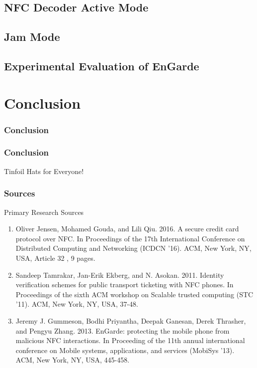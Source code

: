 \documentclass[unknownkeysallowed]{beamer}
\begin{document}
\subsection{NFC Decoder Active Mode}
\subsection{Jam Mode}
\subsection{Experimental Evaluation of EnGarde}


\section{Conclusion}
\begin{frame}
\frametitle{Conclusion}
\begin{center}\begin{minipage}{.9\textwidth}
\tableofcontents[currentsubsection, hideothersubsections, sectionstyle=show/shaded]
\end{minipage}\end{center}
\end{frame}
%
\begin{frame}
  \frametitle{Conclusion}
  \begin{block}{Tinfoil Hats for Everyone!}
  \end{block}
\end{frame}

\begin{frame}
  \frametitle{Sources}
  \begin{block}{Primary Research Sources}
    \begin{enumerate}
      \item{Oliver Jensen, Mohamed Gouda, and Lili Qiu. 2016. A secure credit card protocol over NFC. In Proceedings of the 17th International Conference on Distributed Computing and Networking (ICDCN '16). ACM, New York, NY, USA, Article 32 , 9 pages. %
      }
      \item{Sandeep Tamrakar, Jan-Erik Ekberg, and N. Asokan. 2011. Identity verification schemes for public transport ticketing with NFC phones. In Proceedings of the sixth ACM workshop on Scalable trusted computing (STC '11). ACM, New York, NY, USA, 37-48. %
      }
      \item{Jeremy J. Gummeson, Bodhi Priyantha, Deepak Ganesan, Derek Thrasher, and Pengyu Zhang. 2013. EnGarde: protecting the mobile phone from malicious NFC interactions. In Proceeding of the 11th annual international conference on Mobile systems, applications, and services (MobiSys '13). ACM, New York, NY, USA, 445-458. %
      }
    \end{enumerate}
  \end{block}
\end{frame}
\end{document}
